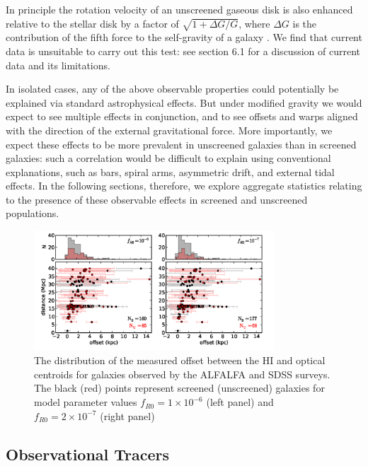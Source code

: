 \documentclass[useAMS,usenatbib,twocolumn]{mn2e}
\begin{document}
\begin{enumerate}
In principle the rotation velocity of an unscreened gaseous
disk is also enhanced relative to the stellar disk by a factor of
$\sqrt{1 + \Delta G/G}$, where $\Delta G$ is the contribution of the fifth force
to the self-gravity of a galaxy \citep{hui10}. 
We find that current data
is unsuitable to carry out this test: 
see section 6.1 for a discussion of current data and its limitations. 

\end{enumerate}

In isolated cases,
any of the above observable properties could potentially be explained via
standard astrophysical effects.  But under modified gravity we would expect
to see multiple effects in conjunction, and to see offsets and warps
aligned with the direction of the external gravitational force.
More importantly, we expect these effects to be more prevalent
in unscreened galaxies than in screened galaxies: such a correlation
would be difficult to explain using conventional explanations,
such as bars, spiral arms, asymmetric drift, and external tidal effects.
In the following sections, therefore, we explore aggregate statistics
relating to the presence of these observable effects in screened and
unscreened populations.  

\begin{figure}
\centering
\includegraphics[width=0.8\textwidth]{figures/Offset_HI_optical_scatter_jake.png}
\caption{The distribution of the measured offset between the HI and
optical centroids for galaxies observed by the ALFALFA and SDSS surveys.
The black (red) points represent screened (unscreened) galaxies for model
parameter values 
$f_{R0}=1\times10^{-6}$ (left panel) and $f_{R0}=2\times10^{-7}$ (right panel)}
\label{fig:offset}
\end{figure}

\subsection{Observational Tracers}
\label{sec:halpha}
\end{document}
